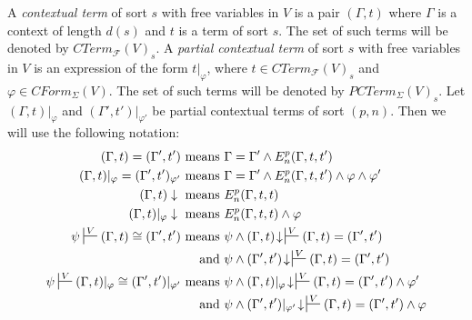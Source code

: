 \documentclass[reqno]{amsart}
\theoremstyle{definition}
\theoremstyle{remark}
\numberwithin{figure}{section}
\begin{document}
A \emph{contextual term} of sort $s$ with free variables in $V$ is a pair $(\Gamma,t)$ where $\Gamma$ is a context of length $d(s)$ and $t$ is a term of sort $s$.
The set of such terms will be denoted by $CTerm_\mathcal{F}(V)_s$.
A \emph{partial contextual term} of sort $s$ with free variables in $V$ is an expression of the form $t|_\varphi$,
where $t \in CTerm_\mathcal{F}(V)_s$ and $\varphi \in CForm_\Sigma(V)$.
The set of such terms will be denoted by $PCTerm_\Sigma(V)_s$.
Let $(\Gamma,t)|_\varphi$ and $(\Gamma',t')|_{\varphi'}$ be partial contextual terms of sort $(p,n)$.
Then we will use the following notation:
\begin{align*}
(\Gamma,t) = (\Gamma',t') \text{ means } & \Gamma = \Gamma' \land E^p_n(\Gamma,t,t') \\
(\Gamma,t)|_\varphi = (\Gamma',t')_{\varphi'} \text{ means } & \Gamma = \Gamma' \land E^p_n(\Gamma,t,t') \land \varphi \land \varphi' \\
(\Gamma,t) \downarrow \text{ means } & E^p_n(\Gamma,t,t) \\
(\Gamma,t)|_\varphi \downarrow \text{ means } & E^p_n(\Gamma,t,t) \land \varphi \\
\psi \sststile{}{V} (\Gamma,t) \cong (\Gamma',t') \text{ means } & \psi \land (\Gamma,t)\!\downarrow\,\sststile{}{V} (\Gamma,t) = (\Gamma',t') \\
    \text{ and } & \psi \land (\Gamma',t')\!\downarrow\,\sststile{}{V} (\Gamma,t) = (\Gamma',t') \\
\psi \sststile{}{V} (\Gamma,t)|_\varphi \cong (\Gamma',t')|_{\varphi'} \text{ means } & \psi \land (\Gamma,t)|_\varphi\!\downarrow\,\sststile{}{V} (\Gamma,t) = (\Gamma',t') \land \varphi' \\
    \text{ and } & \psi \land (\Gamma',t')|_{\varphi'}\!\downarrow\,\sststile{}{V} (\Gamma,t) = (\Gamma',t') \land \varphi
\end{align*}
\end{document}
